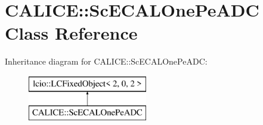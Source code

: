 \section{C\-A\-L\-I\-C\-E\-:\-:Sc\-E\-C\-A\-L\-One\-Pe\-A\-D\-C Class Reference}
\label{classCALICE_1_1ScECALOnePeADC}
Inheritance diagram for C\-A\-L\-I\-C\-E\-:\-:Sc\-E\-C\-A\-L\-One\-Pe\-A\-D\-C\-:\begin{figure}[H]
\begin{center}
\leavevmode
\includegraphics[height=2.000000cm]{classCALICE_1_1ScECALOnePeADC}
\end{center}
\end{figure}
